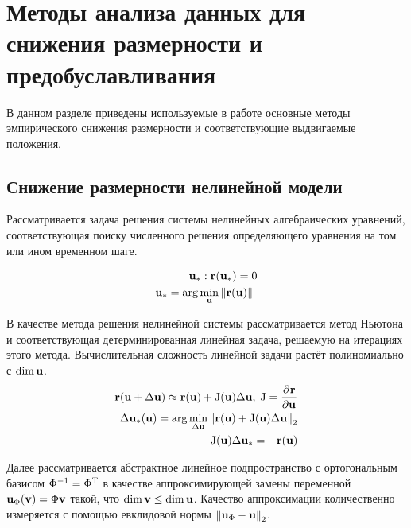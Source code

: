 \section{Методы анализа данных для снижения размерности и предобуславливания}

В данном разделе приведены используемые в работе основные методы эмпирического снижения размерности и соответствующие выдвигаемые положения.

\subsection{Снижение размерности нелинейной модели}

Рассматривается задача решения системы нелинейных алгебраических уравнений, соответствующая поиску численного решения определяющего уравнения на том или ином временном шаге.

\begin{align}
    \unk_\ast : \resid(\unk_\ast) = 0 \\
   \unk_\ast = \arg \min_{\unk} \norm{\resid(\unk)}
\end{align}

В качестве метода решения нелинейной системы рассматривается метод Ньютона и соответствующая детерминированная линейная задача, решаемую на итерациях этого метода. Вычислительная сложность линейной задачи растёт полиномиально с $\dim \unk$.
\begin{align}
    \resid(\unk + \Delta \unk) \approx \resid(\unk) + \jac(\unk) \dunk ,\; \jac = \deriv{\resid}{\unk}\\
    \dunk_\ast (\unk) = \arg \min_{\dunk} \norm[2]{\resid(\unk) + \jac(\unk) \dunk} \label{eq:du}\\
    \jac(\unk) \dunk_\ast = - \resid(\unk)
\end{align}

Далее рассматривается абстрактное линейное подпространство с ортогональным базисом $\Phi^{-1} = \transpose{\Phi}$ в качестве аппроксимирующей замены переменной $\unk_\Phi (\vunk) = \Phi \vunk$ такой, что $\dim{\vunk} \leq \dim{\unk}$. Качество аппроксимации количественно измеряется с помощью евклидовой нормы $\norm[2]{\unk_\Phi - \unk}$.


